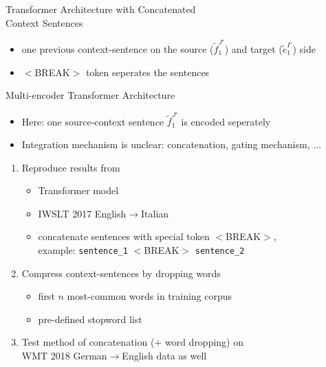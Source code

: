 \documentclass[11pt, a4paper, landscape]{article}
\begin{document}
\NewPage
\begin{center}
  \large Transformer Architecture with Concatenated \\
  Context Sentences
\end{center}

\begin{itemize}
  \item one previous context-sentence on the source ($\tilde{f}_1^{J'}$) and target ($\tilde{e}_1^{I'}$) side
  \item $<$BREAK$>$ token seperates the sentences
\end{itemize}

\NewPage
\begin{center}
  \large Multi-encoder Transformer Architecture
\end{center}

\begin{itemize}
  \item Here: one source-context sentence $\tilde{f}_1^{J'}$ is encoded seperately
  \item Integration mechanism is unclear: concatenation, gating mechanism, $\ldots$
\end{itemize}


\NewPage
{}
\hypertarget{sec:ongoing_work}{}
\vfill
\begin{enumerate}
	\item Reproduce results from \cite{agrawal_2018}
	\begin{itemize}
		\item Transformer model
    \item IWSLT 2017 English$\to$Italian
		\item concatenate sentences with special token $<$BREAK$>$, \\
    example: \texttt{sentence\_1} $<$BREAK$>$ \texttt{sentence\_2}
 	\end{itemize}
    \item Compress context-sentences by dropping words
    \begin{itemize}
      \item first $n$ most-common words in training corpus
      \item pre-defined stopword list
    \end{itemize}
  \item Test method of concatenation ($+$ word dropping) on \\
  WMT 2018 German$\to$English data as well
\end{enumerate}
\vfill
\end{document}
